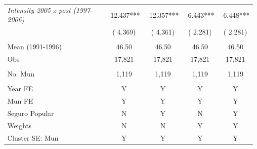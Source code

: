 \begin{tabular}{lcccc}
\textit{Intensity 2005 x post (1997-2006)} &      -12.437*** &      -12.357*** &       -6.443*** &       -6.448*** \\ 
 & (       4.369) & (       4.361) & (       2.281) & (       2.281) \\ 
  & & & & \\ 
Mean (1991-1996) &        46.50 &        46.50 &        46.50 &        46.50 \\ 
Obs &       17,821 &       17,821 &       17,821 &       17,821 \\ 
  & & & & \\ 
No. Mun &        1,119 &        1,119 &        1,119 &        1,119 \\ 
  & & & & \\ 
Year FE & Y & Y & Y & Y \\ 
Mun FE & Y & Y & Y & Y \\ 
Seguro Popular & N & Y & N & Y \\ 
Weights & N & N & Y & Y \\ 
Cluster SE: Mun & Y & Y & Y & Y \\ 
\bottomrule
\end{tabular}